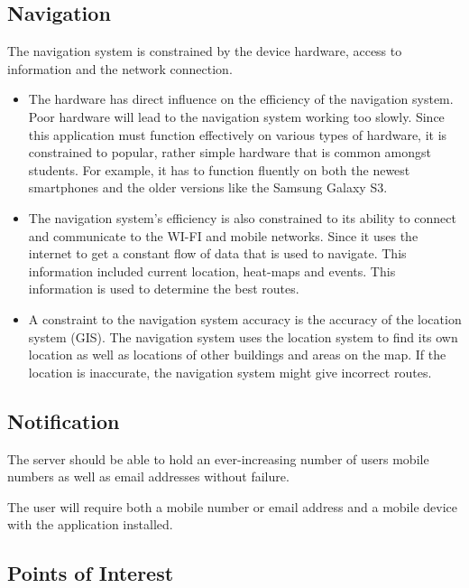 \documentclass[runningheads,a4paper]{article}
\begin{document}
\subsection{Navigation}

The navigation system is constrained by the device hardware, access to information and the network connection.

\begin{itemize}
\item The hardware has direct influence on the efficiency of the navigation system. Poor hardware will lead to the navigation system working too slowly. Since this application must function effectively on various types of hardware, it is constrained to popular, rather simple hardware that is common amongst students. For example, it has to function fluently on both the newest smartphones and the older versions like the Samsung Galaxy S3.

\item The navigation system’s efficiency is also constrained to its ability to connect and communicate to the WI-FI and mobile networks. Since it uses the internet to get a constant flow of data that is used to navigate. This information included current location, heat-maps and events. This information is used to determine the best routes.

\item A constraint to the navigation system accuracy is the accuracy of the location system (GIS). The navigation system uses the location system to find its own location as well as locations of other buildings and areas on the map. If the location is inaccurate, the navigation system might give incorrect routes. 

\end{itemize}

\subsection{Notification}

The server should be able to hold an ever-increasing number of users mobile numbers as well as email addresses without failure.  

The user will require both a mobile number or email address and a mobile device with the application installed.

\subsection{Points of Interest}
\end{document}
